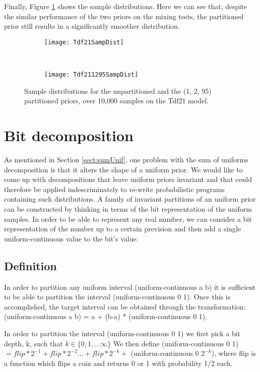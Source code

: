 Finally, Figure \ref{fig:tdf21PSampDist} shows the sample distributions. Here we can see that, despite the similar performance of the two priors on the mixing tests, the partitioned prior still results in a significantly smoother distribution.

\begin{figure}[h]
    \centering
    \begin{subfigure}[t]{0.48\textwidth}
      \texttt{[image: Tdf21SampDist]}
    \end{subfigure}
    ~
    \begin{subfigure}[t]{0.48\textwidth}
      \texttt{[image: Tdf211295SampDist]}
    \end{subfigure}
    \caption{Sample distributions for the unpartitioned and the (1, 2, 95) partitioned priors, over 10,000 samples on the Tdf21 model.}
    \label{fig:tdf21PSampDist}
\end{figure}

\section{Bit decomposition}
\label{sect:bitDecomp}
As mentioned in Section \ref{sect:sumUnif}, one problem with the sum of uniforms decomposition is that it alters the shape of a uniform prior. We would like to come up with decompositions that leave uniform priors invariant and that could therefore be applied indescriminately to re-write probabilistic programs containing such distributions. A family of invariant partitions of an uniform prior can be constructed by thinking in terms of the bit representation of the uniform samples. In order to be able to represent any real number, we can consider a bit representation of the number up to a certain prevision and then add a single uniform-continuous value to the bit's value. 

\subsection{Definition}
In order to partition any uniform interval (uniform-continuous a b) it is sufficient to be able to partition the interval (uniform-continuous 0 1). Once this is accomplished, the target interval can be obtained through the transformation: (uniform-continuous a b) = a + (b-a) * (uniform-continuous 0 1).

In order to partition the interval (uniform-continuous 0 1) we first pick a bit depth, k, such that $ k \in \{ 0, 1, \ldots \infty \} $ We then define (uniform-continuous 0 1) $= flip*2^{-1} + flip*2^{-2} \ldots + flip*2^{-k} +$ (uniform-continuous 0 $2^{-k}$), where flip is a function which flips a coin and returns 0 or 1 with probability 1/2 each.

